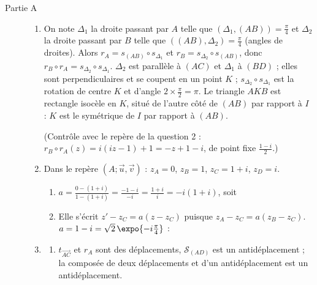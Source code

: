 \begin{description}
	\item[Partie A]
	\begin{enumerate}
		\item {}
			On note $\Delta_1$ la droite passant par $A$ telle que $\left(\Delta_1 , (AB)\right) = \frac{\pi}{4}$ et $\Delta_2$ la droite passant par $B$ telle que $\left((AB) , \Delta_2\right) = \frac{\pi}{4}$
			(angles de droites). Alors $r_A = s_{(AB)} \circ s_{\Delta_1}$ et $r_B = s_{\Delta_2} \circ s_{(AB)}$, donc
			$r_B \circ r_A = s_{\Delta_2} \circ s_{\Delta_1}$.
			$\Delta_2$ est parallèle à $(AC)$ et $\Delta_1$ à $(BD)$ ; elles sont perpendiculaires et se coupent en un point $K$ ;
			$s_{\Delta_2} \circ s_{\Delta_1}$ est la rotation de centre $K$ et d'angle $2 \times \frac{\pi}{2} = \pi$.
			Le triangle $AKB$ est rectangle isocèle en $K$, situé de l'autre côté de $(AB)$ par rapport à $I$ : $K$ est le symétrique de $I$ par rapport à $(AB)$.
			\par\noindent{}
			(Contrôle avec le repère de la question 2 : $r_B \circ r_A (z) = i(iz - 1) + 1 = -z + 1 - i$, de point fixe $\frac{1 - i}{2}$.)
		\item Dans le repère $(A;\vec{u},\vec{v})$ : $z_A = 0$, $z_B = 1$, $z_C = 1 + i$, $z_D = i$.
		\begin{enumerate}
			\item {}
				$a = \frac{0 - (1+i)}{1 - (1+i)} = \frac{-1 - i}{-i} = \frac{1 + i}{i} = -i(1 + i)$, soit \par\noindent{}
			\item {}
				Elle s'écrit $z' - z_C = a(z - z_C)$ puisque $z_A - z_C = a(z_B - z_C)$.
				$a = 1 - i = \sqrt{2}\,\expo{-i\frac{\pi}{4}}$ : \par\noindent{}
		\end{enumerate}
		\item
		\begin{enumerate}
			\item {}
				$t_{\overrightarrow{AC}}$ et $r_A$ sont des déplacements, $\mathscr{S}_{(AD)}$ est un antidéplacement ; la composée de deux déplacements et d'un antidéplacement est un antidéplacement.
				\par\noindent{}

\end{enumerate}
\end{enumerate}
\end{description}
